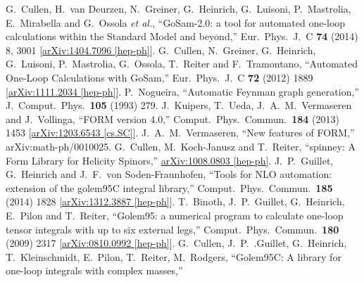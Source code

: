 \documentclass[a4paper]{article}
\begin{document}
\begin{thebibliography}{ABC}
  G.~Cullen, H.~van Deurzen, N.~Greiner, G.~Heinrich, G.~Luisoni, P.~Mastrolia, E.~Mirabella and G.~Ossola {\it et al.},
  ``GoSam-2.0: a tool for automated one-loop calculations within the Standard Model and beyond,''
  Eur.\ Phys.\ J.\ C {\bf 74} (2014) 8,  3001
  [\href{http://arxiv.org/abs/1404.7096}{arXiv:1404.7096 [hep-ph]}].
  G.~Cullen, N.~Greiner, G.~Heinrich, G.~Luisoni, P.~Mastrolia, G.~Ossola, T.~Reiter and F.~Tramontano,
  ``Automated One-Loop Calculations with GoSam,''
  Eur.\ Phys.\ J.\ C {\bf 72} (2012) 1889
  [\href{http://arxiv.org/abs/1111.2034}{arXiv:1111.2034 [hep-ph]}].
  P.~Nogueira,
  ``Automatic Feynman graph generation,''
  J.\ Comput.\ Phys.\  {\bf 105} (1993) 279.
  J.~Kuipers, T.~Ueda, J.~A.~M.~Vermaseren and J.~Vollinga,
  ``FORM version 4.0,''
  Comput.\ Phys.\ Commun.\  {\bf 184} (2013) 1453
  [\href{http://arxiv.org/abs/1203.6543}{arXiv:1203.6543 [cs.SC]}].
  J.~A.~M.~Vermaseren,
  ``New features of FORM,''
  arXiv:math-ph/0010025.
  G.~Cullen, M.~Koch-Janusz and T.~Reiter,
  ``spinney: A Form Library for Helicity Spinors,''
  \href{http://arxiv.org/abs/1008.0803}{arXiv:1008.0803 [hep-ph]}.
  J.~P.~Guillet, G.~Heinrich and J.~F.~von Soden-Fraunhofen,
  ``Tools for NLO automation: extension of the golem95C integral library,''
  Comput.\ Phys.\ Commun.\  {\bf 185} (2014) 1828
  [\href{http://arxiv.org/abs/1312.3887}{arXiv:1312.3887 [hep-ph]}].
  T.~Binoth, J.~P.~Guillet, G.~Heinrich, E.~Pilon and T.~Reiter,
  ``Golem95: a numerical program to calculate one-loop tensor integrals with up
  to six external legs,''
  Comput.\ Phys.\ Commun.\  {\bf 180} (2009) 2317
  [\href{http://arxiv.org/abs/0810.0992}{arXiv:0810.0992 [hep-ph]}].
  G.~Cullen, J.~P.~.Guillet, G.~Heinrich, T.~Kleinschmidt, E.~Pilon, T.~Reiter, M.~Rodgers,
  ``Golem95C: A library for one-loop integrals with complex masses,''

\end{thebibliography}
\end{document}
